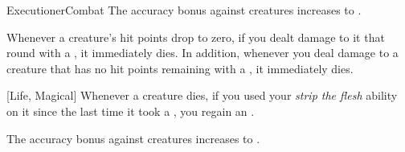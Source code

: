 \begin{feat}{Executioner}{Combat}
         The accuracy bonus against  creatures increases to .

         Whenever a creature's hit points drop to zero, if you dealt damage to it that round with a , it immediately dies.
        In addition, whenever you deal damage to a creature that has no hit points remaining with a , it immediately dies.

        [Life, Magical] Whenever a creature dies, if you used your \textit{strip the flesh} ability on it since the last time it took a , you regain an .

         The accuracy bonus against  creatures increases to .
    \end{feat}


